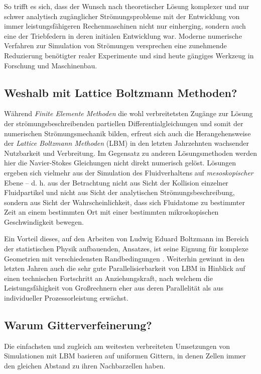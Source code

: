 So trifft es sich, dass der Wunsch nach theoretischer Lösung komplexer und nur schwer analytisch zugänglicher Strömungsprobleme mit der Entwicklung von immer leistungsfähigeren Rechenmaschinen nicht nur einherging, sondern auch eine der Triebfedern in deren initialen Entwicklung war. Moderne numerische Verfahren zur Simulation von Strömungen versprechen eine zunehmende Reduzierung benötigter realer Experimente und sind heute gängiges Werkzeug in Forschung und Maschinenbau.

\subsection{Weshalb mit Lattice Boltzmann Methoden?}

Während \emph{Finite Elemente Methoden} die wohl verbreitetsten Zugänge zur Lösung der strömungsbeschreibenden partiellen Differentialgleichungen und somit der numerischen Strömungsmechanik bilden, erfreut sich auch die Herangehensweise der \emph{Lattice Boltzmann Methoden} (LBM) in den letzten Jahrzehnten wachsender Nutzbarkeit und Verbreitung. Im Gegensatz zu anderen Lösungsmethoden werden hier die Navier-Stokes Gleichungen nicht direkt numerisch gelöst. Lösungen ergeben sich vielmehr aus der Simulation des Fluidverhaltens auf \emph{mesoskopischer} Ebene -- d. h. aus der Betrachtung nicht aus Sicht der Kollision einzelner Fluidpartikel und nicht aus Sicht der analytischen Strömungsbeschreibung, sondern aus Sicht der Wahrscheinlichkeit, dass sich Fluidatome zu bestimmter Zeit an einem bestimmten Ort mit einer bestimmten mikroskopischen Geschwindigkeit bewegen.

\bigskip
Ein Vorteil dieses, auf den Arbeiten von Ludwig Eduard Boltzmann im Bereich der statistischen Physik aufbauenden, Ansatzes, ist seine Eignung für komplexe Geometrien mit verschiedensten Randbedingungen \cite{Aidun10}. Weiterhin gewinnt in den letzten Jahren auch die sehr gute Parallelisierbarkeit von LBM in Hinblick auf einen technischen Fortschritt an Anziehungskraft, nach welchem die Leistungsfähigkeit von Großrechnern eher aus deren Parallelität als aus individueller Prozessorleistung erwächst.

\subsection{Warum Gitterverfeinerung?}

Die einfachsten und zugleich am weitesten verbreiteten Umsetzungen von Simulationen mit LBM basieren auf uniformen Gittern, in denen Zellen immer den gleichen Abstand zu ihren Nachbarzellen haben.

